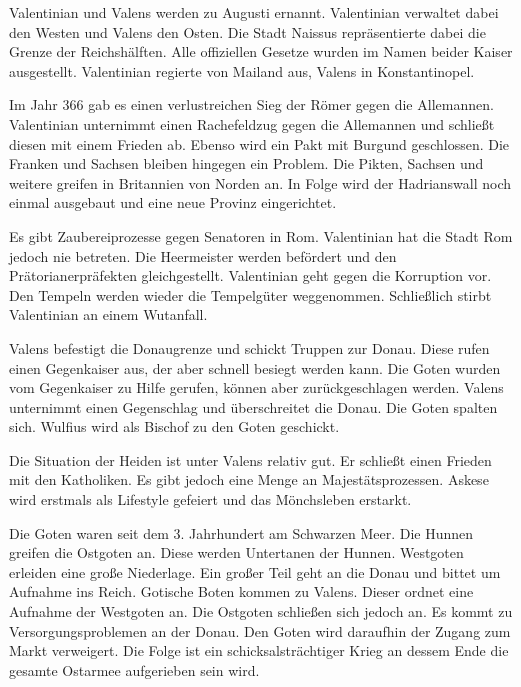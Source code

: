 \documentclass[10pt,a4paper,oneside,ngerman,numbers=noenddot]{scrartcl}
\begin{document}
Valentinian und Valens werden zu Augusti ernannt. Valentinian verwaltet dabei
den Westen und Valens den Osten. Die Stadt Naissus repräsentierte dabei die
Grenze der Reichshälften. Alle offiziellen Gesetze wurden im Namen beider
Kaiser ausgestellt. Valentinian regierte von Mailand aus, Valens in Konstantinopel.

Im Jahr 366 gab es einen verlustreichen Sieg der Römer gegen die Allemannen.
Valentinian unternimmt einen Rachefeldzug gegen die Allemannen und schließt
diesen mit einem Frieden ab. Ebenso wird ein Pakt mit Burgund geschlossen.
Die Franken und Sachsen bleiben hingegen ein Problem. Die Pikten, Sachsen und
weitere greifen in Britannien von Norden an. In Folge wird der Hadrianswall
noch einmal ausgebaut und eine neue Provinz eingerichtet.

Es gibt Zaubereiprozesse gegen Senatoren in Rom. Valentinian hat die Stadt
Rom jedoch nie betreten. Die Heermeister werden befördert und den Prätorianerpräfekten
gleichgestellt. Valentinian geht gegen die Korruption vor. Den Tempeln werden
wieder die Tempelgüter weggenommen. Schließlich stirbt Valentinian an einem
Wutanfall.

Valens befestigt die Donaugrenze und schickt Truppen zur Donau. Diese rufen
einen Gegenkaiser aus, der aber schnell besiegt werden kann. Die Goten wurden
vom Gegenkaiser zu Hilfe gerufen, können aber zurückgeschlagen werden. Valens
unternimmt einen Gegenschlag und überschreitet die Donau. Die Goten spalten sich.
Wulfius wird als Bischof zu den Goten geschickt.

Die Situation der Heiden ist unter Valens relativ gut. Er schließt einen Frieden
mit den Katholiken. Es gibt jedoch eine Menge an Majestätsprozessen. Askese wird
erstmals als Lifestyle gefeiert und das Mönchsleben erstarkt.

Die Goten waren seit dem 3. Jahrhundert am Schwarzen Meer. Die Hunnen greifen
die Ostgoten an. Diese werden Untertanen der Hunnen. Westgoten erleiden eine große
Niederlage. Ein großer Teil geht an die Donau und bittet um Aufnahme ins Reich.
Gotische Boten kommen zu Valens. Dieser ordnet eine Aufnahme der Westgoten an.
Die Ostgoten schließen sich jedoch an. Es kommt zu Versorgungsproblemen an der
Donau. Den Goten wird daraufhin der Zugang zum Markt verweigert. Die Folge
ist ein schicksalsträchtiger Krieg an dessem Ende die gesamte Ostarmee aufgerieben
sein wird.
\end{document}
